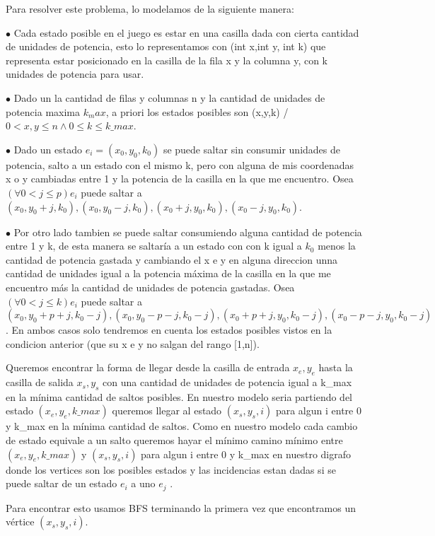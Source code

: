 
Para resolver este problema, lo modelamos de la siguiente manera:

$\bullet$ Cada estado posible en el juego es estar en una casilla dada con cierta cantidad de unidades de potencia, esto lo representamos con (int x,int y, int k) que representa estar posicionado en la casilla de la fila x y la columna y, con k unidades de potencia para usar.

$\bullet$ Dado un la cantidad de filas y columnas n y la cantidad de unidades de potencia maxima $k_max$, a priori los estados posibles son (x,y,k) / $0 < x,y \leq n \wedge 0 \leq k \leq k\_max$. 

$\bullet$ Dado un estado $e_i = (x_0,y_0,k_0)$ se puede saltar sin consumir unidades de potencia, salto a un estado con el mismo k, pero con alguna de mis coordenadas x o y cambiadas entre 1 y la potencia de la casilla en la que me encuentro. Osea  $(\forall 0 < j \leq p ) e_i$ puede saltar a $(x_0,y_0+j,k_0), (x_0,y_0-j,k_0), (x_0+j,y_0,k_0), (x_0-j,y_0,k_0)$.

$\bullet$ Por otro lado tambien se puede saltar consumiendo alguna cantidad de potencia entre 1 y k, de esta manera se saltaría a un estado con con k igual a $k_0$ menos la cantidad de potencia gastada y cambiando el x e y en alguna direccion unna cantidad de unidades igual a la potencia máxima de la casilla en la que me encuentro más la cantidad de unidades de potencia gastadas. Osea $(\forall 0 < j \leq k ) e_i$ puede saltar a $(x_0,y_0+p+j,k_0-j), (x_0,y_0-p-j,k_0-j), (x_0+p+j,y_0,k_0-j), (x_0-p-j,y_0,k_0-j)$. En ambos casos solo tendremos en cuenta los estados posibles vistos en la condicion anterior (que su x e y no salgan del rango [1,n]).

Queremos encontrar la forma de llegar desde la casilla de entrada $x_e,y_e$ hasta la casilla de salida $x_s,y_s$ con una cantidad de unidades de potencia igual a k\_max en la mínima cantidad de saltos posibles. En nuestro modelo seria partiendo del estado $(x_e,y_e,k\_max)$ queremos llegar al estado $(x_s,y_s,i)$ para algun i entre 0 y k\_max en la mínima cantidad de saltos. Como en nuestro modelo cada cambio de estado equivale a un salto queremos hayar el mínimo camino mínimo entre $(x_e,y_e,k\_max)$ y $(x_s,y_s,i)$ para algun i entre 0 y k\_max en nuestro digrafo donde los vertices son los posibles estados y las incidencias estan dadas si se puede saltar de un estado $e_i$ a uno $e_j$ .

Para encontrar esto usamos BFS terminando la primera vez que encontramos un vértice $(x_s,y_s,i)$.



